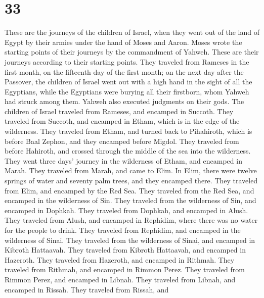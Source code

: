 \hypertarget{section-32}{%
\section{33}\label{section-32}}

 These are the journeys of the children of Israel, when
they went out of the land of Egypt by their armies under the hand of
Moses and Aaron.  Moses wrote the starting points of their
journeys by the commandment of Yahweh. These are their journeys
according to their starting points.  They traveled from
Rameses in the first month, on the fifteenth day of the first month; on
the next day after the Passover, the children of Israel went out with a
high hand in the sight of all the Egyptians,  while the
Egyptians were burying all their firstborn, whom Yahweh had struck among
them. Yahweh also executed judgments on their gods.  The
children of Israel traveled from Rameses, and encamped in Succoth.
 They traveled from Succoth, and encamped in Etham, which
is in the edge of the wilderness.  They traveled from
Etham, and turned back to Pihahiroth, which is before Baal Zephon, and
they encamped before Migdol.  They traveled from before
Hahiroth, and crossed through the middle of the sea into the wilderness.
They went three days' journey in the wilderness of Etham, and encamped
in Marah.  They traveled from Marah, and came to Elim. In
Elim, there were twelve springs of water and seventy palm trees, and
they encamped there.  They traveled from Elim, and
encamped by the Red Sea.  They traveled from the Red Sea,
and encamped in the wilderness of Sin.  They traveled
from the wilderness of Sin, and encamped in Dophkah. 
They traveled from Dophkah, and encamped in Alush.  They
traveled from Alush, and encamped in Rephidim, where there was no water
for the people to drink.  They traveled from Rephidim,
and encamped in the wilderness of Sinai.  They traveled
from the wilderness of Sinai, and encamped in Kibroth Hattaavah.
 They traveled from Kibroth Hattaavah, and encamped in
Hazeroth.  They traveled from Hazeroth, and encamped in
Rithmah.  They traveled from Rithmah, and encamped in
Rimmon Perez.  They traveled from Rimmon Perez, and
encamped in Libnah.  They traveled from Libnah, and
encamped in Rissah.  They traveled from Rissah, and
